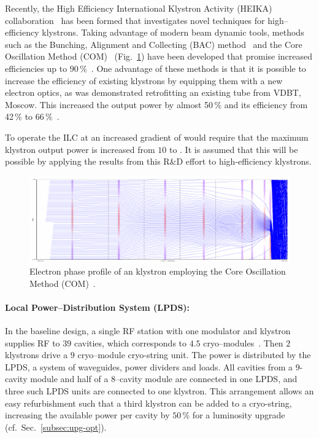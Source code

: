 Recently, the High Efficiency International Klystron Activity (HEIKA) collaboration~\cite{Syratchev:2015a, Gerigk:2018ebm} has been formed that investigates novel techniques for high--efficiency klystrons.
Taking advantage of modern beam dynamic tools, methods such as the Bunching, Alignment and Collecting (BAC) method~\cite{Guzilov:2014a} and the Core Oscillation Method (COM)~\cite{Constable:2017hha} (Fig.~\ref{fig:com})
 have been developed that promise increased efficiencies up to $90\,\%$~\cite{Baikov:2015bif}.  
One advantage of these methods is that it is possible to increase the efficiency of existing klystrons by equipping them with a new electron optics, as was demonstrated retrofitting an existing tube from VDBT, Moscow. 
This increased the output power by almost 50\,\% and its efficiency from 42\,\% to 66\,\%~\cite{Jensen:2016a}.

To operate the ILC at an increased gradient of  would require that the maximum klystron output power is increased from $10$ to . 
It is assumed that this will be possible by applying the results from this R\&D effort to high-efficiency klystrons.
 
\begin{figure}[htbp]
   \includegraphics[width=\hsize]{chapters/figures/eefact16-wet3ah2-fig1}
\caption{Electron phase  profile of an  klystron employing the Core Oscillation Method (COM)~\cite{Constable:2017hha}.
}
\label{fig:com}
\end{figure}

\paragraph{Local Power--Distribution System (LPDS):}

In the baseline design, a single RF station with one modulator and klystron supplies RF to $39$ cavities, which corresponds to $4.5$ cryo--modules~\cite[Sec. 3.6.4]{Adolphsen:2013kya}. Then  $2$ klystrons drive a $9$ cryo--module cryo-string unit.
The power is distributed by the LPDS, a system of waveguides, power dividers and loads. 
All cavities from a $9$-cavity module and half of a $8$--cavity module are connected in one LPDS, and three such LPDS units are connected to one klystron.
This arrangement allows an easy refurbishment such that a third klystron can be added to a cryo-string, increasing the available power per cavity by $50\,\%$ for a luminosity upgrade (cf.\ Sec.~\ref{subsec:upg-opt}).

